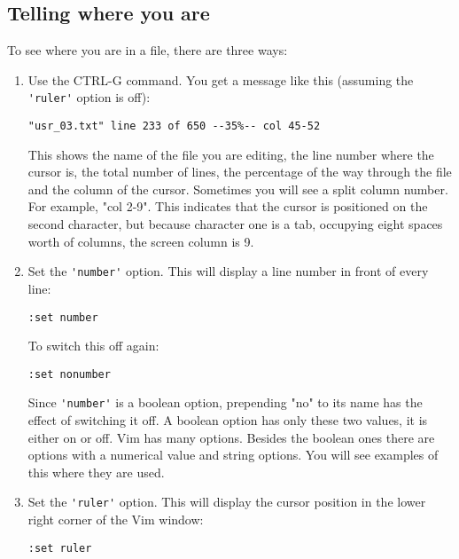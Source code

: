 \subsection{Telling where you are}
To see where you are in a file, there are three ways:
\begin{enumerate}
				\item  Use the CTRL-G command.
								You get a message like this (assuming the \verb!'ruler'! option is off):
								\begin{Verbatim}[samepage=true]
	"usr_03.txt" line 233 of 650 --35%-- col 45-52 
								\end{Verbatim}

								This shows the name of the file you are editing, the line number where the cursor is, the total number of lines, the percentage of the way through the file and the column of the cursor.
								Sometimes you will see a split column number.
								For example, "col 2-9".
								This indicates that the cursor is positioned on the second character, but because character one is a tab, occupying eight spaces worth of columns, the screen column is 9.

				\item  Set the \verb!'number'! option.  This will display a line number in front of
								every line:

								\begin{Verbatim}[samepage=true]
	:set number
								\end{Verbatim}

								To switch this off again:

								\begin{Verbatim}[samepage=true]
	:set nonumber
								\end{Verbatim}

								Since \verb!'number'! is a boolean option, prepending "no" to its name has the effect of switching it off.
								A boolean option has only these two values, it is either on or off.
								Vim has many options.
								Besides the boolean ones there are options with a numerical value and string options.
								You will see examples of this where they are used.

				\item  Set the \verb!'ruler'! option.
								This will display the cursor position in the lower right corner of the Vim window:

								\begin{Verbatim}[samepage=true]
	:set ruler
								\end{Verbatim}

\end{enumerate}


